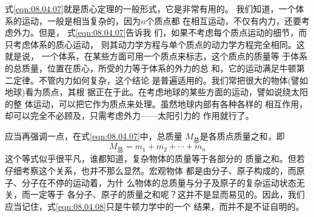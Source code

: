 式\eqref{eqn:08.04.07}就是质心定理的一般形式，它是非常有用的。
我们知道，一个体系的运动，一般是相当复杂的，因为$ n $个质点都
在相互运动，不仅有内力，还要考虑外力。但是，
式\eqref{eqn:08.04.07}告诉我
们，如果不考虑每个质点运动的细节，而只考虑体系的质心运动，
则其动力学方程与单个质点的动力学方程完全相同。这就是说，
一个体系，在某些方面可用一个质点来标志，这个质点的质量等
于体系的总质量，位置在质心，所受的力等于体系的外力的总
和，它的运动满足牛顿第二定律。不管内力如何复杂，这个结论
是普遍适用的。我们常把很大的物体(譬如地球)看为质点，其根
据正在于此。在考虑地球的某些方面的运动，譬如说绕太阳的整
体运动，可以把它作为质点来处理。虽然地球内部有各种各样的
相互作用，却可以完全不必顾及，只需考虑外力——太阳引力的
作用就行了。

应当再强调一点，在式\eqref{eqn:08.04.07}中，总质量
$ M _ { \text {总} } $是各质点质量之和，即
\begin{equation}\label{eqn:08.04.08}
  M _ { \text {总} } = m _ { 1 } + m _ { 2 } + \cdots + m _ { n }
\end{equation}
这个等式似乎很平凡，谁都知道，复杂物体的质量等于各部分的
质量之和。但若仔细考察这个关系，也并不那么显然。宏观物体
都是由分子、原子构成的，而原子、分子在不停的运动着，为什
么物体的总质量与分子及原子的复杂运动状态无关，而一定等于
各分子、原子的质量之和呢？这并不是显而易见的。因此，我们
应当记住，式\eqref{eqn:08.04.08}只是牛顿力学中的一个
结果，而并不是不证自明的。
